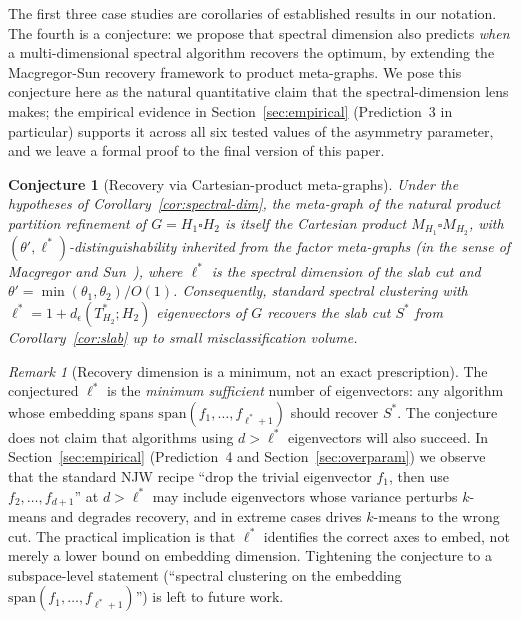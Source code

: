 \documentclass{article}
\newtheorem{conjecture}{Conjecture}
\theoremstyle{definition}
\theoremstyle{remark}
\newtheorem*{remark}{Remark}
\begin{document}
The first three case studies are corollaries of established results in our notation. The fourth is a conjecture: we propose that spectral dimension also predicts \emph{when} a multi-dimensional spectral algorithm recovers the optimum, by extending the Macgregor-Sun recovery framework to product meta-graphs. We pose this conjecture here as the natural quantitative claim that the spectral-dimension lens makes; the empirical evidence in Section~\ref{sec:empirical} (Prediction~3 in particular) supports it across all six tested values of the asymmetry parameter, and we leave a formal proof to the final version of this paper.

\begin{conjecture}[Recovery via Cartesian-product meta-graphs]
\label{conj:recovery}
Under the hypotheses of Corollary~\ref{cor:spectral-dim}, the meta-graph of the natural product partition refinement of $G = H_1 \square H_2$ is itself the Cartesian product $M_{H_1} \square M_{H_2}$, with $(\theta', \ell^*)$-distinguishability inherited from the factor meta-graphs (in the sense of Macgregor and Sun~\cite{macgregor2022tighter}), where $\ell^*$ is the spectral dimension of the slab cut and $\theta' = \min(\theta_1, \theta_2) / O(1)$. Consequently, standard spectral clustering with $\ell^* = 1 + d_\epsilon(T^*_{H_2}; H_2)$ eigenvectors of $G$ recovers the slab cut $S^*$ from Corollary~\ref{cor:slab} up to small misclassification volume.
\end{conjecture}

\begin{remark}[Recovery dimension is a minimum, not an exact prescription]
\label{rem:over-param}
The conjectured $\ell^*$ is the \emph{minimum sufficient} number of eigenvectors: any algorithm whose embedding spans $\mathrm{span}(f_1, \ldots, f_{\ell^*+1})$ should recover $S^*$. The conjecture does not claim that algorithms using $d > \ell^*$ eigenvectors will also succeed. In Section~\ref{sec:empirical} (Prediction~4 and Section~\ref{sec:overparam}) we observe that the standard NJW recipe ``drop the trivial eigenvector $f_1$, then use $f_2, \ldots, f_{d+1}$'' at $d > \ell^*$ may include eigenvectors whose variance perturbs $k$-means and degrades recovery, and in extreme cases drives $k$-means to the wrong cut. The practical implication is that $\ell^*$ identifies the correct axes to embed, not merely a lower bound on embedding dimension. Tightening the conjecture to a subspace-level statement (``spectral clustering on the embedding $\mathrm{span}(f_1, \ldots, f_{\ell^*+1})$'') is left to future work.
\end{remark}
\end{document}
